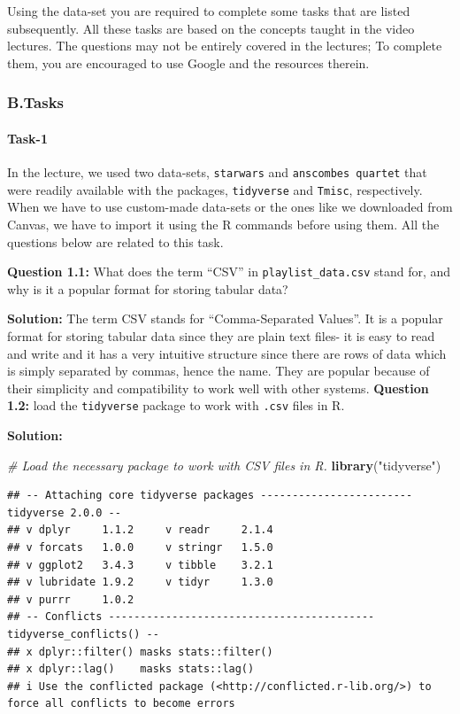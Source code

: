 \documentclass[
]{article}
\newenvironment{Shaded}{\begin{snugshade}}{\end{snugshade}}
\newcommand{\CommentTok}[1]{\textcolor[rgb]{0.56,0.35,0.01}{\textit{#1}}}
\newcommand{\FunctionTok}[1]{\textcolor[rgb]{0.13,0.29,0.53}{\textbf{#1}}}
\newcommand{\NormalTok}[1]{#1}
\newcommand{\StringTok}[1]{\textcolor[rgb]{0.31,0.60,0.02}{#1}}
\begin{document}
Using the data-set you are required to complete some tasks that are
listed subsequently. All these tasks are based on the concepts taught in
the video lectures. The questions may not be entirely covered in the
lectures; To complete them, you are encouraged to use Google and the
resources therein.

\hypertarget{b.tasks}{%
\subsubsection{B.Tasks}\label{b.tasks}}

\hypertarget{task-1}{%
\paragraph{Task-1}\label{task-1}}

In the lecture, we used two data-sets, \texttt{starwars} and
\texttt{anscombe\textquotesingle{}s\ quartet} that were readily
available with the packages, \texttt{tidyverse} and \texttt{Tmisc},
respectively. When we have to use custom-made data-sets or the ones like
we downloaded from Canvas, we have to import it using the R commands
before using them. All the questions below are related to this task.

\textbf{Question 1.1:} What does the term ``CSV'' in
\texttt{playlist\_data.csv} stand for, and why is it a popular format
for storing tabular data?

\textbf{Solution:} The term CSV stands for ``Comma-Separated Values''.
It is a popular format for storing tabular data since they are plain
text files- it is easy to read and write and it has a very intuitive
structure since there are rows of data which is simply separated by
commas, hence the name. They are popular because of their simplicity and
compatibility to work well with other systems. \textbf{Question 1.2:}
load the \texttt{tidyverse} package to work with \texttt{.csv} files in
R.

\textbf{Solution:}

\begin{Shaded}
\begin{Highlighting}[]
\CommentTok{\# Load the necessary package to work with CSV files in R.}
\FunctionTok{library}\NormalTok{(}\StringTok{"tidyverse"}\NormalTok{)}
\end{Highlighting}
\end{Shaded}

\begin{verbatim}
## -- Attaching core tidyverse packages ------------------------ tidyverse 2.0.0 --
## v dplyr     1.1.2     v readr     2.1.4
## v forcats   1.0.0     v stringr   1.5.0
## v ggplot2   3.4.3     v tibble    3.2.1
## v lubridate 1.9.2     v tidyr     1.3.0
## v purrr     1.0.2     
## -- Conflicts ------------------------------------------ tidyverse_conflicts() --
## x dplyr::filter() masks stats::filter()
## x dplyr::lag()    masks stats::lag()
## i Use the conflicted package (<http://conflicted.r-lib.org/>) to force all conflicts to become errors
\end{verbatim}
\end{document}
